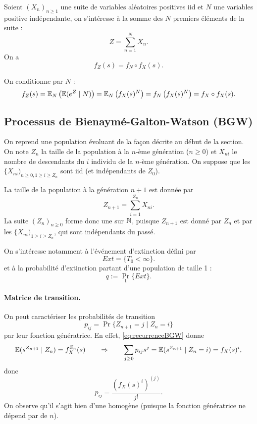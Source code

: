 \begin{proposition}
  Soient $(X_n)_{n \geq 1}$ une suite de variables aléatoires positives iid et $N$ une variables positive indépendante, on s'intéresse à la somme des $N$ premiers éléments de la suite :
  $$
  Z = \sum_{n=1}^N X_n.
  $$
  On a 
  $$
  f_{Z}(s) = f_N \circ f_X(s).
  $$
\end{proposition}

\proof
On conditionne par $N$ :
\begin{align*}
  f_Z(s) 
  = \operatorname{\mathbb{E}}_N \left(\operatorname{\mathbb{E}}(e^Z \mid N) \right)
  = \operatorname{\mathbb{E}}_N \left(f_X(s)^N \right)
  = f_N \left(f_X(s)^N \right) = f_X \circ f_X(s).
\end{align*}

\eproof

\subsection{Processus de Bienaymé-Galton-Watson (BGW)} 

On reprend une population évoluant de la façon décrite au début de la section. 
On note $Z_n$ la taille de la population à la $n$-ème génération ($n \geq 0$) et $X_{ni}$ le nombre de descendants du $i$ individu de la $n$-ème génération. 
On suppose que les $\{X_{ni})_{n \geq 0, 1 \geq i \geq Z_n}$ sont iid (et indépendants de $Z_0$).

\bigskip
La taille de la population à la génération $n+1$ est donnée par 
\begin{equation} \label{eq:recurrenceBGW}
Z_{n+1} = \sum_{i = 1}^{Z_n} X_{ni}.
\end{equation}
La suite $(Z_n)_{n \geq 0}$ forme donc une \cM sur $\mathbb{N}$, puisque $Z_{n+1}$ est donné par $Z_n$ et par les $\{X_{ni})_{1 \geq i \geq Z_n}$, qui sont indépendants du passé.

\bigskip
On s'intéresse notamment à l'événement d'extinction défini par 
$$
Ext = \{T_0 < \infty\}.
$$
et à la probabilité d'extinction partant d'une population de taille 1 : 
$$
q := \Pr_1\{Ext\}.
$$


\paragraph*{Matrice de transition.} 
On peut caractériser les probabilités de transition 
$$
p_{ij} = \Pr\{Z_{n+1} = j \mid Z_n = i\}
$$
par leur fonction génératrice. En effet, \eqref{eq:recurrenceBGW} donne
$$
\operatorname{\mathbb{E}}(s^{Z_{n+1}} \mid Z_n) = f_X^{Z_n}(s)
\qquad \Rightarrow \qquad 
\sum_{j \geq 0} p_{ij} s^j = \operatorname{\mathbb{E}}(s^{Z_{n+1}} \mid Z_n=i) = f_X(s)^i,
$$
donc
$$
p_{ij} = \frac{\left(f_X(s)^i\right)^{(j)}}{j!}.
$$
On observe qu'il s'agit bien d'une \cM homogène (puisque la fonction génératrice ne dépend par de $n$).

